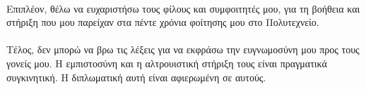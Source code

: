 \documentclass[a4paper,twoside,titlepage,11pt]{book}
\begin{document}
\paragraph{}
Επιπλέον, θέλω να ευχαριστήσω τους φίλους και συμφοιτητές μου, για τη βοήθεια και στήριξη που μου παρείχαν στα πέντε χρόνια φοίτησης μου στο Πολυτεχνείο.
\paragraph{}
Τέλος, δεν μπορώ να βρω τις λέξεις για να εκφράσω την ευγνωμοσύνη μου προς τους γονείς μου. Η εμπιστοσύνη και η αλτρουιστική στήριξη τους είναι πραγματικά συγκινητική. Η διπλωματική αυτή είναι αφιερωμένη σε αυτούς.


\newpage
\tableofcontents
{\small\listoffigures}
\printbibliography
\end{document}
